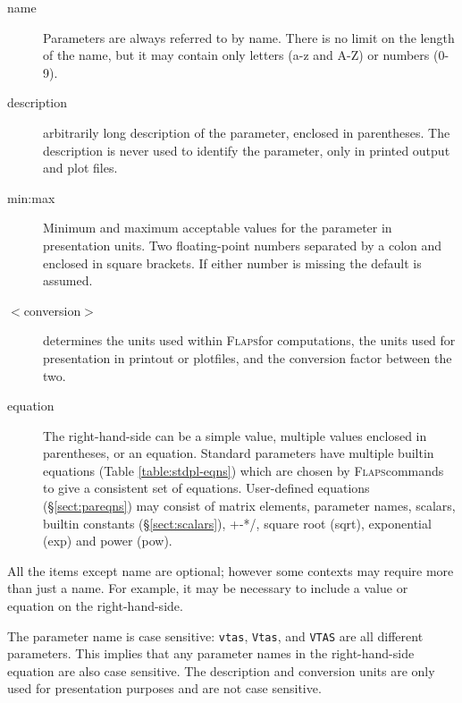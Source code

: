 \documentclass[11pt,openany,twoside]{book}
\numberwithin{equation}{section}		%
\newcommand{\Code}[1]{{\small\tt #1}}
\newcommand{\Subst}[1]{{\small\sf #1}}
\newcommand{\Flaps}{\textsc{Flaps\:}}
\newcommand{\Sectref}[1]{\S\ref{#1}}
\newcommand{\Tableref}[1]{Table \ref{#1}}
\begin{document}
\begin{description}
	\item[\Subst{name}] Parameters are always referred to by name. There is
		no limit on the length of the name, but it may contain only letters
		(a-z and A-Z) or numbers (0-9).
                
	\item[\Subst{description}] arbitrarily long description of the parameter,
			 enclosed in parentheses. The description is never used to identify
			 the parameter, only in printed output and plot files.
                
	\item[\Subst{min:max}]
	Minimum and maximum acceptable values for the parameter in presentation units.
	Two floating-point numbers separated by a colon and enclosed in square
	brackets. If either number is missing the default is assumed.
                
	\item[$<$\Subst{conversion}$>$]
	determines the units used within \Flaps for computations, the units used for
	presentation in printout or plotfiles, and the conversion factor between the two.
                
	\item[\Subst{equation}]
	The right-hand-side can be a simple value, multiple values enclosed in
	parentheses, or an equation. Standard parameters have multiple builtin
	equations (\Tableref{table:stdpl-eqns}) which are chosen by \Flaps commands to give
	a consistent set of equations.  User-defined equations (\Sectref{sect:pareqns})
	may consist of matrix elements, parameter names, scalars, builtin constants
	(\Sectref{sect:scalars}), +-*/, square root (sqrt), exponential (exp)
	and power (pow).
                
\end{description}
\par
All the items except \Subst{name} are optional; however some
contexts may require more than just a name. For example, it may
be necessary to include a value or equation on the right-hand-side.
\par
The parameter name is case sensitive: \Code{vtas}, \Code{Vtas}, and \Code{VTAS}
are all different parameters.
This implies that any parameter names in the right-hand-side equation
are also case sensitive.
The description and conversion units are only used for presentation
purposes and are not case sensitive.
\end{document}
